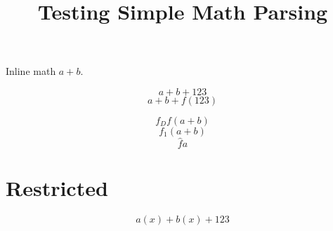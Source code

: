 \documentclass{article}
\title{Testing Simple Math Parsing}
\begin{document}
Inline math $a + b$.

$$ a + b + 123$$
$$ a + b + f(123)$$

$$ f_D f(a+b)$$
$$ f_1(a+b)$$
$$ \hat{f} a $$

\section{Restricted}\label{sec:restricted}
$$ a(x) + b(x) + 123$$
\end{document}
